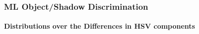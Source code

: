 \begin{frame}
    \frametitle{ML Object/Shadow Discrimination}
    \framesubtitle{Distributions over the Differences in HSV 
        components}
  
    \begin{figure}
        \centering
        \hspace{0.05cm}
        \hspace{0.05cm}

\end{figure}
\end{frame}
